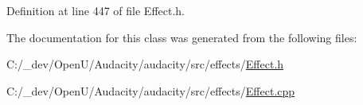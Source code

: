 Definition at line 447 of file Effect.\+h.



The documentation for this class was generated from the following files\+:\begin{DoxyCompactItemize}
\item 
C\+:/\+\_\+dev/\+Open\+U/\+Audacity/audacity/src/effects/\hyperlink{src_2effects_2_effect_8h}{Effect.\+h}\item 
C\+:/\+\_\+dev/\+Open\+U/\+Audacity/audacity/src/effects/\hyperlink{src_2effects_2_effect_8cpp}{Effect.\+cpp}\end{DoxyCompactItemize}
